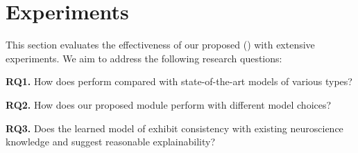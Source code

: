 \section{Experiments}
This section evaluates the effectiveness of our proposed \methodfull (\methodtable) with extensive experiments. We aim to address the following research questions: 

\textbf{RQ1.} How does \methodtable perform compared with state-of-the-art models of various types? %

\textbf{RQ2.} How does our proposed \poolingshort module perform with different model choices? 

\textbf{RQ3.} Does the learned model of \methodtable exhibit consistency with existing neuroscience knowledge and suggest reasonable explainability?

